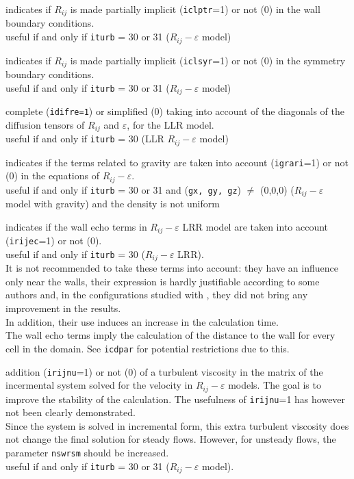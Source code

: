 {indicates if $R_{ij}$ is made partially implicit
({\tt iclptr}=1) or not (0) in the wall boundary conditions.\\
useful if and only if {\tt iturb} = 30 or 31 ($R_{ij}-\varepsilon$ model)}

{indicates if $R_{ij}$ is made partially implicit
({\tt iclsyr}=1) or not (0) in the symmetry boundary conditions.\\
useful if and only if {\tt iturb} = 30 or 31 ($R_{ij}-\varepsilon$ model)}

{complete ({\tt idifre=1}) or simplified (0)
taking into account of the diagonals of the diffusion tensors of $R_{ij}$
and $\varepsilon$, for the LLR model.\\
useful if and only if {\tt iturb} = 30 (LLR $R_{ij}-\varepsilon$ model)}

{indicates if the terms related to gravity are
taken into account ({\tt igrari}=1) or not (0) in the equations of
$R_{ij}-\varepsilon$. \\
useful if and only if {\tt iturb} = 30 or 31 and ({\tt gx, gy, gz}) $\ne$
(0,0,0) ($R_{ij}-\varepsilon$ model with gravity) and the density is not uniform}

{indicates if the wall echo terms in
$R_{ij}-\varepsilon$ LRR model are
taken into account ({\tt irijec}=1) or not (0).\\
useful if and only if {\tt iturb} = 30 ($R_{ij}-\varepsilon$ LRR).\\
It is not recommended to take these terms into account:
they have an influence only near the walls, their expression is hardly
justifiable according to some authors and, in the configurations
studied with \CS, they did not bring any improvement in the results.\\
In addition, their use induces an increase in the calculation
time.\\
The wall echo terms imply the calculation of the distance to the wall
for every cell in the domain. See {\tt icdpar} for potential restrictions
due to this.}

{addition ({\tt irijnu}=1) or not (0) of a
turbulent viscosity in the matrix of the incermental system solved
for the velocity in $R_{ij}-\varepsilon$ models. The goal is to improve
the stability of the calculation. The usefulness of {\tt irijnu}=1 has
however not been clearly demonstrated.\\
Since the system is solved in incremental form, this extra turbulent
viscosity does not change the final solution for steady flows. However,
for unsteady flows, the parameter {\tt nswrsm} should be increased.\\
useful if and only if {\tt iturb} = 30 or 31 ($R_{ij}-\varepsilon$ model).}

